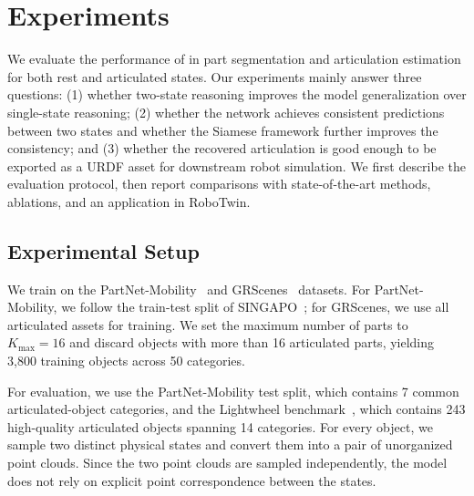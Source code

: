 \section{Experiments}%

\label{sec:experiments}

We evaluate the performance of \method in part segmentation and articulation estimation for both rest and articulated states.
Our experiments mainly answer three questions:
(1) whether two-state reasoning improves the model generalization over single-state reasoning;
(2) whether the network achieves consistent predictions between two states and whether the Siamese framework further improves the consistency;
and (3) whether the recovered articulation is good enough to be exported as a URDF asset for downstream robot simulation.
We first describe the evaluation protocol, then report comparisons with state-of-the-art methods, ablations, and an application in RoboTwin.



\subsection{Experimental Setup}
\label{sec:exp_setup}

We train \method on the PartNet-Mobility~\cite{Mo_2019_CVPR} and GRScenes~\cite{wang2024grutopia} datasets.
For PartNet-Mobility, we follow the train-test split of SINGAPO~\cite{liusingapo}; for GRScenes, we use all articulated assets for training.
We set the maximum number of parts to $K_{\max}=16$ and discard objects with more than 16 articulated parts, yielding 3,800 training objects across 50 categories.

For evaluation, we use the PartNet-Mobility test split, which contains 7 common articulated-object categories, and the Lightwheel benchmark~\cite{lightwheel_simready_2025}, which contains 243 high-quality articulated objects spanning 14 categories.
For every object, we sample two distinct physical states and convert them into a pair of unorganized point clouds.
Since the two point clouds are sampled independently, the model does not rely on explicit point correspondence between the states.



